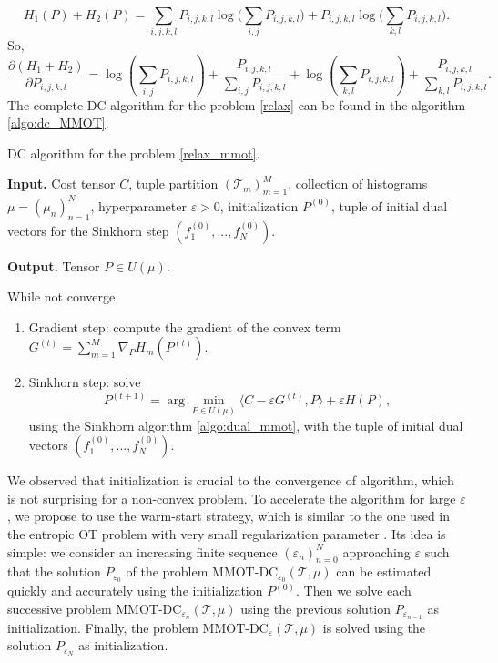 \begin{equation}
  H_1(P) + H_2(P) = \sum_{i,j,k,l} P_{i,j,k,l}
  \log\big( \sum_{i,j} P_{i,j,k,l} \big) + P_{i,j,k,l} \log\big( \sum_{k,l} P_{i,j,k,l} \big).
\end{equation}
So,
\begin{equation} \label{optim_condition}
  \frac{\partial (H_1 + H_2)}{\partial P_{i,j,k,l}} = \log \left( \sum_{i,j} P_{i,j,k,l} \right) +
  \frac{P_{i,j,k,l}}{\sum_{i,j} P_{i,j,k,l}} +
  \log \left( \sum_{k,l} P_{i,j,k,l} \right) + \frac{P_{i,j,k,l}}{\sum_{k,l} P_{i,j,k,l}}.
\end{equation}
The complete DC algorithm for the problem \ref{relax} can be found in the algorithm \ref{algo:dc_MMOT}.
\begin{algorithm}[h]
  \caption{DC algorithm for the problem \ref{relax_mmot}.}
  \textbf{Input.} Cost tensor $C$, tuple partition $(\mathcal T_m)_{m=1}^M$, collection of histograms $\mu = (\mu_n)_{n=1}^N$,
  hyperparameter $\varepsilon > 0$, initialization $P^{(0)}$, tuple of initial dual vectors for the
  Sinkhorn step $(f_1^{(0)},...,f_N^{(0)})$.

  \textbf{Output.} Tensor $P \in U(\mu)$.

  While not converge
  \begin{enumerate}
    \item Gradient step: compute the gradient of the convex term $G^{(t)} = \sum\limits_{m=1}^M \nabla_P H_m(P^{(t)})$.
    \item Sinkhorn step: solve
    \begin{equation}
      P^{(t+1)} = \arg\min_{P \in U(\mu)} \langle C - \varepsilon G^{(t)}, P \rangle + \varepsilon H(P),
    \end{equation}
    using the Sinkhorn algorithm \ref{algo:dual_mmot}, with the tuple of initial dual vectors $(f_1^{(0)},...,f_N^{(0)})$.
  \end{enumerate}
  \label{algo:dc_MMOT}
\end{algorithm}
We observed that initialization is crucial to the convergence of algorithm, which
is not surprising for a non-convex problem. To accelerate the algorithm for large $\varepsilon$,
we propose to use the warm-start strategy, which is similar to the one used in the entropic OT problem with very
small regularization parameter \citep{Schmitzer19}. Its idea is simple: we consider an increasing finite sequence
$(\varepsilon_n)_{n=0}^N$ approaching $\varepsilon$ such that the solution $P_{\varepsilon_0}$ of the problem
$\text{MMOT-DC}_{\varepsilon_0}(\mathcal T, \mu)$ can be estimated quickly and accurately using the initialization $P^{(0)}$. Then we solve each
successive problem $\text{MMOT-DC}_{\varepsilon_n}(\mathcal T, \mu)$ using the previous solution $P_{\varepsilon_{n-1}}$ as initialization. Finally,
the problem $\text{MMOT-DC}_{\varepsilon}(\mathcal T, \mu)$ is solved using the solution $P_{\varepsilon_N}$ as initialization.


